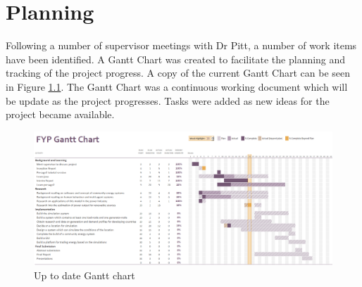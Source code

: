 \chapter{Planning}
\label{Planning}
Following a number of supervisor meetings with Dr Pitt, a number of work items have been identified. A Gantt Chart was created to facilitate the planning and tracking of the project progress. A copy of the current Gantt Chart can be seen in Figure \ref{fig:GanttChart}. The Gantt Chart was a continuous working document which will be update as the project progresses. Tasks were added as new ideas for the project became available. 

\begin{figure}[h!]
\centering
\includegraphics[scale=0.5, angle=90]{Images/GanttChart.png}
\caption{Up to date Gantt chart}
\label{fig:GanttChart}
\end{figure}